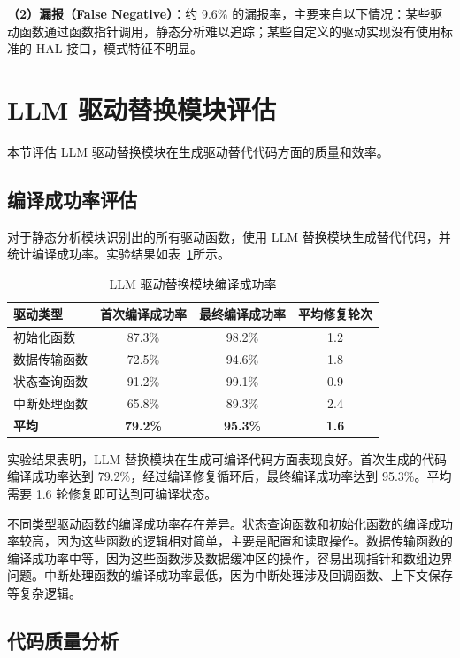 \textbf{（2）漏报（False Negative）}：约 9.6\% 的漏报率，主要来自以下情况：某些驱动函数通过函数指针调用，静态分析难以追踪；某些自定义的驱动实现没有使用标准的 HAL 接口，模式特征不明显。

\section{LLM 驱动替换模块评估}
\label{sec:eval_llm}

本节评估 LLM 驱动替换模块在生成驱动替代代码方面的质量和效率。

\subsection{编译成功率评估}

对于静态分析模块识别出的所有驱动函数，使用 LLM 替换模块生成替代代码，并统计编译成功率。实验结果如表~\ref{tab:llm_results}所示。

\begin{table}[htbp]
\centering
\caption{LLM 驱动替换模块编译成功率}
\label{tab:llm_results}
\begin{tabular}{lccc}
\toprule
\textbf{驱动类型} & \textbf{首次编译成功率} & \textbf{最终编译成功率} & \textbf{平均修复轮次} \\
\midrule
初始化函数 & 87.3\% & 98.2\% & 1.2 \\
数据传输函数 & 72.5\% & 94.6\% & 1.8 \\
状态查询函数 & 91.2\% & 99.1\% & 0.9 \\
中断处理函数 & 65.8\% & 89.3\% & 2.4 \\
\midrule
\textbf{平均} & \textbf{79.2\%} & \textbf{95.3\%} & \textbf{1.6} \\
\bottomrule
\end{tabular}
\end{table}

实验结果表明，LLM 替换模块在生成可编译代码方面表现良好。首次生成的代码编译成功率达到 79.2\%，经过编译修复循环后，最终编译成功率达到 95.3\%。平均需要 1.6 轮修复即可达到可编译状态。

不同类型驱动函数的编译成功率存在差异。状态查询函数和初始化函数的编译成功率较高，因为这些函数的逻辑相对简单，主要是配置和读取操作。数据传输函数的编译成功率中等，因为这些函数涉及数据缓冲区的操作，容易出现指针和数组边界问题。中断处理函数的编译成功率最低，因为中断处理涉及回调函数、上下文保存等复杂逻辑。

\subsection{代码质量分析}

